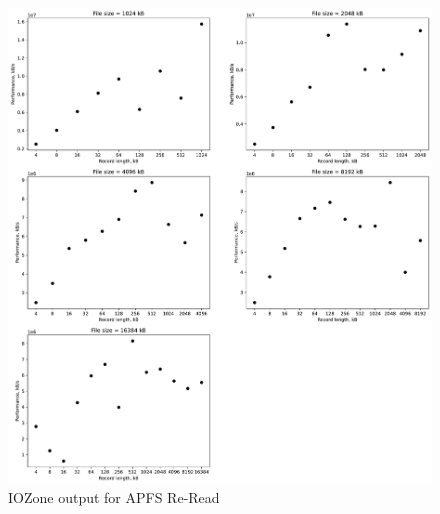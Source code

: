 \begin{figure}[!htb]
	\label{fig:app_benchapfss_re_read}
	\begin{center}
		\includegraphics[width=1.0\textwidth]{figures/benchmarking/local/Re-Read.pdf}
	\end{center}
	\caption{IOZone output for APFS Re-Read}
\end{figure}

